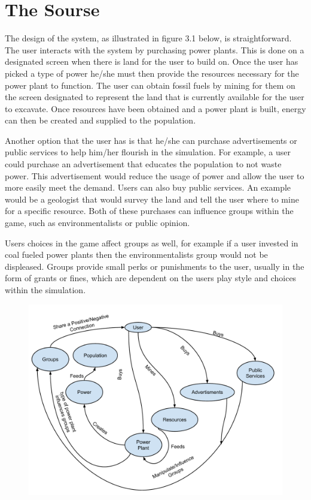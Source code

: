 \documentclass[msc,oneside]{ubcthesis}%
\begin{document}
\chapter{The Sourse}

The design of the system, as illustrated in figure 3.1 below, is straightforward. The user interacts with 
the system by purchasing power plants. This is done on a designated screen when there is land for the user 
to build on. Once the user has picked a type of power he/she must then provide the resources necessary for 
the power plant to function. The user can obtain fossil fuels by mining for them on the screen designated 
to represent the land that is currently available for the user to excavate. Once resources have been 
obtained and a power plant is built, energy can then be created and supplied to the population.
\bigskip

Another option that the user has is that he/she can purchase advertisements or public services to help 
him/her flourish in the simulation. For example, a user could purchase an advertisement that educates the 
population to not waste power. This advertisement would reduce the usage of power and allow the user to 
more easily meet the demand. Users can also buy public services. An example would be a geologist that would 
survey the land and tell the user where to mine for a specific resource. Both of these purchases can 
influence groups within the game, such as environmentalists or public opinion. 
\bigskip

Users choices in the game affect groups as well, for example if a user invested in coal fueled power plants then the environmentalists group would not be displeased. Groups provide small perks or punishments to the user, usually in the form of grants or fines, which are dependent on the users play style and choices within the simulation. 

\begin{figure}[ht]
  \begin{center}
    \includegraphics[width=1\textwidth]{DFDDiagram}
    \caption[Figure 1]{\label{DFD Diagram} }
  \end{center}
\end{figure}
\end{document}
